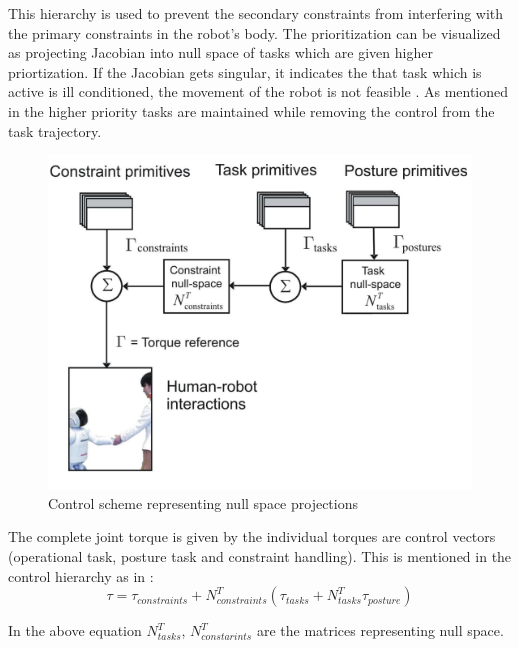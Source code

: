 This hierarchy is used to prevent the secondary constraints from interfering with the primary constraints in the robot’s body.
The prioritization can be visualized as projecting Jacobian into null space of tasks which are given higher priortization. If the Jacobian gets singular, it indicates the that task which is active is ill conditioned, the movement of the robot is not feasible \cite{sentis2006whole}. As mentioned in \cite{sentis2006whole} the higher priority tasks are maintained while removing the control from the task trajectory.

\begin{figure}
	\centering
	\includegraphics[scale=0.5]{images/OSF}
	\caption{Control scheme representing null space projections \cite{sentis2006whole}}
\end{figure}
The complete joint torque is given by the individual torques are control vectors (operational task, posture task and constraint handling). This is mentioned in the control hierarchy as in \cite{sentis2006whole}:
\begin{equation}
\tau = \tau_{constraints} + N_{constraints}^{T} (\tau_{tasks}+ N_{tasks}^{T}\tau_{posture})
\label{torquescomplete}
\end{equation}


In the above equation $N_{tasks}^{T}$, $N_{constarints}^{T}$ are the matrices representing null space.

